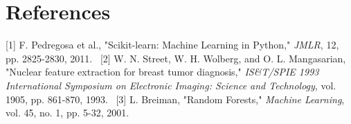 \documentclass[12pt,a4paper]{article}
\begin{document}
\section{References}
[1] F. Pedregosa et al., "Scikit-learn: Machine Learning in Python," \textit{JMLR}, 12, pp. 2825-2830, 2011.
\
[2] W. N. Street, W. H. Wolberg, and O. L. Mangasarian, "Nuclear feature extraction for breast tumor diagnosis," \textit{IS\&T/SPIE 1993 International Symposium on Electronic Imaging: Science and Technology}, vol. 1905, pp. 861-870, 1993.
\
[3] L. Breiman, "Random Forests," \textit{Machine Learning}, vol. 45, no. 1, pp. 5-32, 2001.
\end{document}
